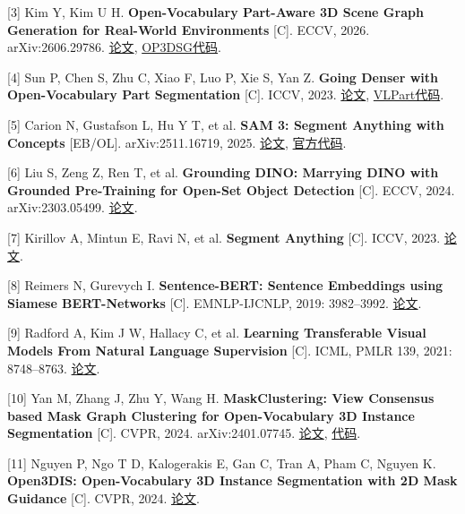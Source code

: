 \documentclass[UTF8,fontset=fandol]{ctexart}
\begin{document}
[3] Kim Y, Kim U H. \textbf{Open-Vocabulary Part-Aware 3D Scene Graph Generation for Real-World Environments} [C]. ECCV, 2026. arXiv:2606.29786. \href{https://arxiv.org/abs/2606.29786}{论文}, \href{https://github.com/AutoCompSysLab/OP3DSG}{OP3DSG代码}.



[4] Sun P, Chen S, Zhu C, Xiao F, Luo P, Xie S, Yan Z. \textbf{Going Denser with Open-Vocabulary Part Segmentation} [C]. ICCV, 2023. \href{https://openaccess.thecvf.com/content/ICCV2023/papers/Sun\_Going\_Denser\_with\_Open-Vocabulary\_Part\_Segmentation\_ICCV\_2023\_paper.pdf}{论文}, \href{https://github.com/facebookresearch/VLPart}{VLPart代码}.



[5] Carion N, Gustafson L, Hu Y T, et al. \textbf{SAM 3: Segment Anything with Concepts} [EB/OL]. arXiv:2511.16719, 2025. \href{https://arxiv.org/abs/2511.16719}{论文}, \href{https://github.com/facebookresearch/sam3}{官方代码}.



[6] Liu S, Zeng Z, Ren T, et al. \textbf{Grounding DINO: Marrying DINO with Grounded Pre-Training for Open-Set Object Detection} [C]. ECCV, 2024. arXiv:2303.05499. \href{https://arxiv.org/abs/2303.05499}{论文}.



[7] Kirillov A, Mintun E, Ravi N, et al. \textbf{Segment Anything} [C]. ICCV, 2023. \href{https://arxiv.org/abs/2304.02643}{论文}.



[8] Reimers N, Gurevych I. \textbf{Sentence-BERT: Sentence Embeddings using Siamese BERT-Networks} [C]. EMNLP-IJCNLP, 2019: 3982–3992. \href{https://aclanthology.org/D19-1410/}{论文}.



[9] Radford A, Kim J W, Hallacy C, et al. \textbf{Learning Transferable Visual Models From Natural Language Supervision} [C]. ICML, PMLR 139, 2021: 8748–8763. \href{https://proceedings.mlr.press/v139/radford21a.html}{论文}.



[10] Yan M, Zhang J, Zhu Y, Wang H. \textbf{MaskClustering: View Consensus based Mask Graph Clustering for Open-Vocabulary 3D Instance Segmentation} [C]. CVPR, 2024. arXiv:2401.07745. \href{https://arxiv.org/abs/2401.07745}{论文}, \href{https://github.com/PKU-EPIC/MaskClustering}{代码}.



[11] Nguyen P, Ngo T D, Kalogerakis E, Gan C, Tran A, Pham C, Nguyen K. \textbf{Open3DIS: Open-Vocabulary 3D Instance Segmentation with 2D Mask Guidance} [C]. CVPR, 2024. \href{https://openaccess.thecvf.com/content/CVPR2024/papers/Nguyen\_Open3DIS\_Open-Vocabulary\_3D\_Instance\_Segmentation\_with\_2D\_Mask\_Guidance\_CVPR\_2024\_paper.pdf}{论文}.
\end{document}
